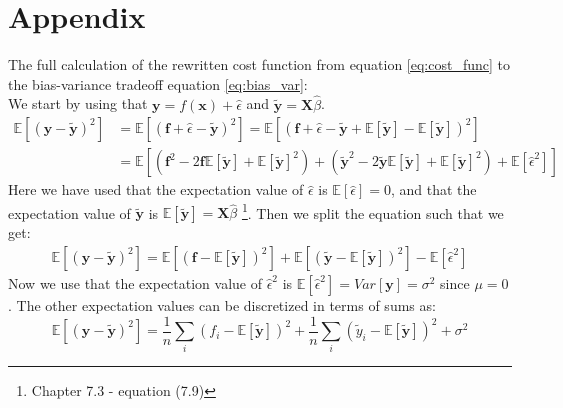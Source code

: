 \documentclass[12pt,a4paper,english]{article}
\begin{document}
\section{Appendix}
\label{sect:bias_var_calc}
The full calculation of the rewritten cost function from equation \ref{eq:cost_func} to the bias-variance tradeoff equation \ref{eq:bias_var}:\\
We start by using that $\textbf{y}=f(\textbf{x})+\hat{\epsilon}$ and $\tilde{\textbf{y}}=\textbf{X}\hat{\beta}$.
\begin{align*}
\mathds{E}[(\textbf{y}-\tilde{\textbf{y}})^2]&=\mathds{E}[(\textbf{f}+\hat{\epsilon}-\tilde{\textbf{y}})^2]= \mathds{E}[(\textbf{f}+\hat{\epsilon}-\tilde{\textbf{y}}+\mathds{E}[\tilde{\textbf{y}}]-\mathds{E}[\tilde{\textbf{y}}])^2]\\
&=\mathds{E}[(\textbf{f}^2-2\textbf{f}\mathds{E}[\tilde{\textbf{y}}]+\mathds{E}[\tilde{\textbf{y}}]^2)+(\tilde{\textbf{y}}^2-2\tilde{\textbf{y}}\mathds{E}[\tilde{\textbf{y}}]+\mathds{E}[\tilde{\textbf{y}}]^2)+\mathds{E}[\hat{\epsilon}^2]]
\end{align*}
Here we have used that the expectation value of $\hat{\epsilon}$ is $\mathds{E}[\hat{\epsilon}]=0$, and that the expectation value of $\tilde{\textbf{y}}$ is $\mathds{E}[\tilde{\textbf{y}}]=\textbf{X}\hat{\beta}$ \cite{hastie2009}\footnote{Chapter 7.3 - equation (7.9)}. Then we split the equation such that we get:
\begin{align*}
\mathds{E}[(\textbf{y}-\tilde{\textbf{y}})^2]=\mathds{E}[(\textbf{f}-\mathds{E}[\tilde{\textbf{y}}])^2]+\mathds{E}[(\tilde{\textbf{y}}-\mathds{E}[\tilde{\textbf{y}}])^2]-\mathds{E}[\hat{\epsilon}^2]
\end{align*}
Now we use that the expectation value of $\hat{\epsilon}^2$ is $\mathds{E}[\hat{\epsilon}^2]=Var[\textbf{y}]=\sigma^2$ since $\mu=0$. The other expectation values can be discretized in terms of sums as:
\begin{equation*}
\mathds{E}[(\textbf{y}-\tilde{\textbf{y}})^2]=\frac{1}{n}\sum_{i}(f_i-\mathds{E}[\tilde{\textbf{y}}])^2+ \frac{1}{n}\sum_{i}(\tilde{y}_i-\mathds{E}[\tilde{\textbf{y}}])^2+\sigma^2
\end{equation*}



\end{document}

